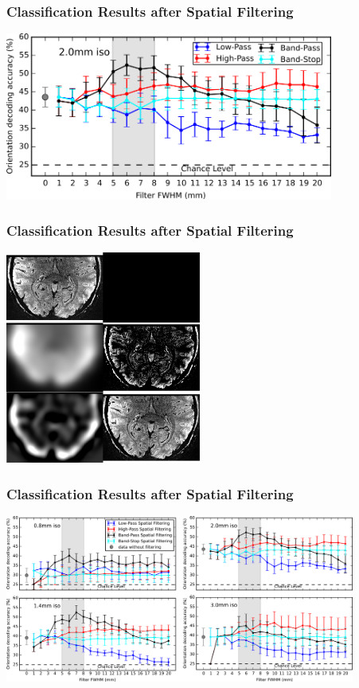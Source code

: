 \documentclass{beamer}
\begin{document}
    
  \begin{frame}
    \frametitle{Classification Results after Spatial Filtering}
        \begin{center}
            \includegraphics[height=5.5cm]{../pictures/spatial_smoothing}
        \end{center}
    \end{frame} 

  \begin{frame}
    \frametitle{Classification Results after Spatial Filtering}
        \begin{center}
            \includegraphics[height=7cm]{../pictures/filtering_steps}
        \end{center}
    \end{frame} 

  \begin{frame}
    \frametitle{Classification Results after Spatial Filtering}
        \begin{center}
            \includegraphics[height=5.5cm]{../pictures/spatial_smoothing_multires}
        \end{center}
    \end{frame} 
\end{document}
